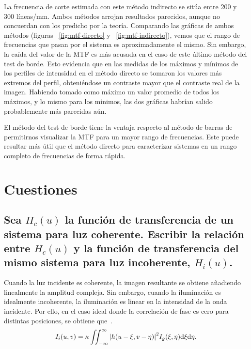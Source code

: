 \documentclass{./packages/optica-article}
\begin{document}
La frecuencia de corte estimada con este método indirecto se sitúa entre 200 y 300 líneas/mm. Ambos métodos arrojan resultados parecidos, aunque no concuerdan con los predicho por la teoría. Comparando las gráficas de ambos métodos (figuras ~\ref{fig:mtf-directo} y ~\ref{fig:mtf-indirecto}), vemos que el rango de frecuencias que pasan por el sistema es aproximadamente el mismo. Sin embargo, la caída del valor de la MTF es más acusada en el caso de este último método del test de borde. Esto evidencia que en las medidas de los máximos y mínimos de los perfiles de intensidad en el método directo se tomaron los valores más extremos del perfil, obteniéndose un contraste mayor que el contraste real de la imagen. Habiendo tomado como máximo un valor promedio de todos los máximos, y lo mismo para los mínimos, las dos gráficas habrían salido probablemente más parecidas aún.

El método del test de borde tiene la ventaja respecto al método de barras de permitirnos visualizar la MTF para un mayor rango de frecuencias. Este puede resultar más útil que el método directo para caracterizar sistemas en un rango completo de frecuencias de forma rápida. 






\section{Cuestiones}

\subsection{Sea $H_{c}(u)$ la función de transferencia de un sistema para luz coherente. Escribir la relación entre $H_{c}(u)$ y la función de transferencia del mismo sistema para luz incoherente, $H_{i}(u)$.}\label{sec:cuestion:incoherente}

Cuando la luz incidente es coherente, la imagen resultante se obtiene añadiendo linealmente la amplitud compleja. Sin embargo, cuando la iluminación es idealmente incoherente, la iluminación es linear en la intensidad de la onda incidente. Por ello, en el caso ideal donde la correlación de fase es cero para distintas posiciones, se obtiene que~\cite[p.~132--134]{goodman1996introduction}.
\nopagebreak
\begin{equation}
	I_{i}(u,v) = \kappa \iint_{-\infty}^{\infty}\abs{h(u - \xi, v- \eta)}^{2} I_{g}(\xi, \eta) \dd \xi \dd \eta.
\end{equation}
\end{document}
